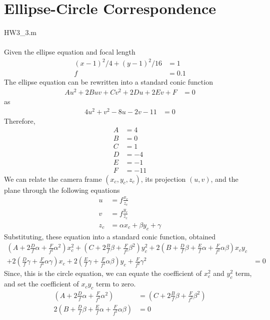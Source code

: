 \documentclass[]{article}
\begin{document}
\newpage
\section{Ellipse-Circle Correspondence}
HW3\_3.m\\
\\
\indent Given the ellipse equation and focal length
\begin{align*}
(x-1)^2/4+(y-1)^2/16 &= 1\\
f &= 0.1
\end{align*}
\indent The ellipse equation can be rewritten into a standard conic function
\begin{align*}
Au^2+2Buv+Cv^2+2Du+2Ev+F &= 0
\end{align*}
\indent as
\begin{align*}
4u^2+v^2-8u-2v-11 &= 0 
\end{align*}
\indent Therefore,
\begin{align*}
A &= 4\\
B &= 0\\
C &= 1\\
D &= -4\\
E &= -1\\
F &= -11
\end{align*}
\indent We can relate the camera frame $(x_c, y_c, z_c)$, its projection $(u, v)$, and the plane through the following equations
\begin{align*}
u &= f\frac{x_c}{z_c}\\
v &= f\frac{y_c}{z_c}\\
z_c &= \alpha x_c + \beta y_c + \gamma
\end{align*}
\indent Substituting, these equation into a standard conic function, obtained
\begin{align*}
(A+2\frac{D}{f}\alpha+\frac{F}{f^2}\alpha^2)x_c^2+(C+2\frac{B}{f}\beta+\frac{F}{f^2}\beta^2)y_c^2+2(B+\frac{D}{f}\beta+\frac{E}{f}\alpha+\frac{F}{f^2}\alpha\beta)x_cy_c\\+2(\frac{D}{f}\gamma+\frac{F}{f^2}\alpha\gamma)x_c+2(\frac{E}{f}\gamma+\frac{F}{f^2}\alpha\beta)y_c+\frac{F}{f^2}\gamma^2 &= 0
\end{align*}
\indent Since, this is the circle equation, we can equate the coefficient of $x_c^2$ and $y_c^2$ term, and set the coefficient of $x_cy_c$ term to zero.
\begin{align*}
(A+2\frac{D}{f}\alpha+\frac{F}{f^2}\alpha^2) &= (C+2\frac{B}{f}\beta+\frac{F}{f^2}\beta^2)\\
2(B+\frac{D}{f}\beta+\frac{E}{f}\alpha+\frac{F}{f^2}\alpha\beta) &= 0
\end{align*}
\end{document}
